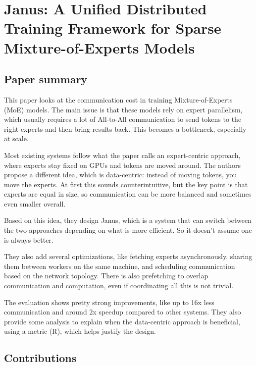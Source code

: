 \documentclass[a4paper, 12pt]{article}
\begin{document}
\section*{Janus: A Unified Distributed Training Framework for Sparse\\Mixture-of-Experts Models}
\subsection{Paper summary}

This paper looks at the communication cost in training Mixture-of-Experts (MoE) models. The main issue is that these models rely on expert parallelism, which usually requires a lot of All-to-All communication to send tokens to the right experts and then bring results back. This becomes a bottleneck, especially at scale.

Most existing systems follow what the paper calls an expert-centric approach, where experts stay fixed on GPUs and tokens are moved around. The authors propose a different idea, which is data-centric: instead of moving tokens, you move the experts. At first this sounds counterintuitive, but the key point is that experts are equal in size, so communication can be more balanced and sometimes even smaller overall.

Based on this idea, they design Janus, which is a system that can switch between the two approaches depending on what is more efficient. So it doesn’t assume one is always better.

They also add several optimizations, like fetching experts asynchronously, sharing them between workers on the same machine, and scheduling communication based on the network topology. There is also prefetching to overlap communication and computation, even if coordinating all this is not trivial.

The evaluation shows pretty strong improvements, like up to 16x less communication and around 2x speedup compared to other systems. They also provide some analysis to explain when the data-centric approach is beneficial, using a metric (R), which helps justify the design.

\subsection{Contributions}
\end{document}
